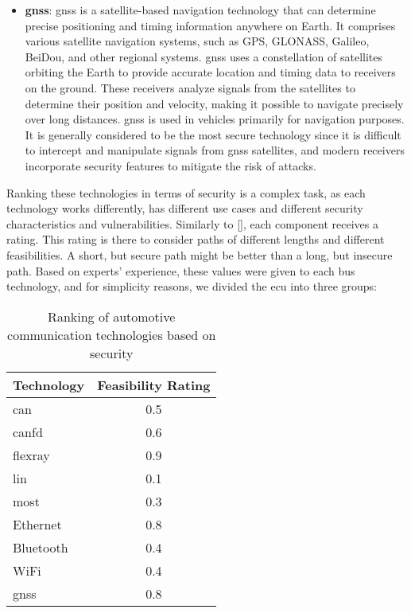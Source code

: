 \begin{itemize}
    \item \textbf{\acrlong{gnss}}: \acrshort{gnss} is a satellite-based navigation technology that can determine precise positioning and timing information anywhere on Earth. 
    It comprises various satellite navigation systems, such as GPS, GLONASS, Galileo, BeiDou, and other regional systems.
    \acrshort{gnss} uses a constellation of satellites orbiting the Earth to provide accurate location and timing data to receivers on the ground. 
    These receivers analyze signals from the satellites to determine their position and velocity, making it possible to navigate precisely over long distances.
    \acrshort{gnss} is used in vehicles primarily for navigation purposes.
    It is generally considered to be the most secure technology since it is difficult to intercept and manipulate signals from \acrshort{gnss} satellites, 
    and modern receivers incorporate security features to mitigate the risk of attacks.

\end{itemize}
    
Ranking these technologies in terms of security is a complex task, as each technology works differently,
has different use cases and different security characteristics and vulnerabilities.
Similarly to [\cite{threat_surf}], each component receives a rating.
This rating is there to consider paths of different lengths and different feasibilities.
A short, but secure path might be better than a long, but insecure path.
Based on experts' experience, these values were given to each bus technology, and for 
simplicity reasons, we divided the \acrshort{ecu} into three groups:

\begin{table}[h]
    \label{table:bus_rating}
    \centering
    \begin{tabular}{|l|c|}
    \hline
    \textbf{Technology} & \textbf{Feasibility Rating} \\
    \hline
    \acrshort{can} & 0.5 \\
    \acrshort{canfd} & 0.6 \\
    \acrshort{flexray} & 0.9 \\
    \acrshort{lin} & 0.1 \\
    \acrshort{most} & 0.3 \\
    Ethernet & 0.8 \\
    Bluetooth & 0.4 \\
    WiFi & 0.4 \\
    \acrshort{gnss} & 0.8 \\
    \hline
    \end{tabular}
    \caption{Ranking of automotive communication technologies based on security}
\end{table}

